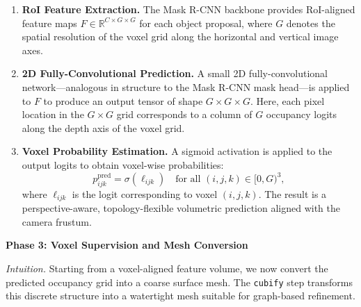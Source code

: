 \begin{enumerate}[label=\textbf{Step \arabic*:}, leftmargin=1.8em, resume]
    
    \item \textbf{RoI Feature Extraction.}  
    The Mask R-CNN backbone provides RoI-aligned feature maps \( F \in \mathbb{R}^{C \times G \times G} \) for each object proposal, where \( G \) denotes the spatial resolution of the voxel grid along the horizontal and vertical image axes.
    
    \item \textbf{2D Fully-Convolutional Prediction.}  
    A small 2D fully-convolutional network—analogous in structure to the Mask R-CNN mask head—is applied to \( F \) to produce an output tensor of shape \( G \times G \times G \). Here, each pixel location in the \( G \times G \) grid corresponds to a column of \( G \) occupancy logits along the depth axis of the voxel grid.
    
    \item \textbf{Voxel Probability Estimation.}  
    A sigmoid activation is applied to the output logits to obtain voxel-wise probabilities:
    \[
    p_{ijk}^{\text{pred}} = \sigma(\ell_{ijk}) \quad \text{for all } (i,j,k) \in [0,G)^3,
    \]
    where \( \ell_{ijk} \) is the logit corresponding to voxel \( (i,j,k) \). The result is a perspective-aware, topology-flexible volumetric prediction aligned with the camera frustum.
    
\end{enumerate}

\medskip
\noindent
\textbf{Phase 3: Voxel Supervision and Mesh Conversion}

\medskip
\noindent
\emph{Intuition.} Starting from a voxel-aligned feature volume, we now convert the predicted occupancy grid into a coarse surface mesh. The \texttt{cubify} step transforms this discrete structure into a watertight mesh suitable for graph-based refinement.

